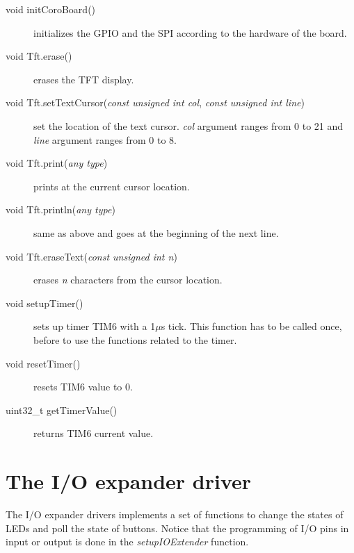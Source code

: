 \documentclass[11pt]{report}
\begin{document}
\begin{description}
     \item[void initCoroBoard()] initializes the GPIO and the SPI according to the hardware of the board.
    \item[void Tft.erase()] erases the TFT display.
    \item[void Tft.setTextCursor(\textit{const unsigned int col}, \textit{const unsigned int line})] set the location of the text cursor. \textit{col} argument ranges from 0 to 21 and \textit{line} argument ranges from 0 to 8.
    \item[void Tft.print(\textit{any type})] prints at the current cursor location. 
    \item[void Tft.println(\textit{any type})] same as above and goes at the beginning of the next line. 
    \item[void Tft.eraseText(\textit{const unsigned int n})] erases \textit{n} characters from the cursor location. 

    \item[void setupTimer()] sets up timer TIM6 with a 1$\mu$s tick. This function has to be called once, before to use the functions related to the timer.
    \item[void resetTimer()] resets TIM6 value to 0.
    \item[uint32_t getTimerValue()] returns TIM6 current value.
\end{description}


\section{The I/O expander driver}

The I/O expander drivers implements a set of functions to change the states of LEDs and poll the state of buttons.
Notice that the programming of I/O pins in input or output is done in the \textit{setupIOExtender} function.
\end{document}
